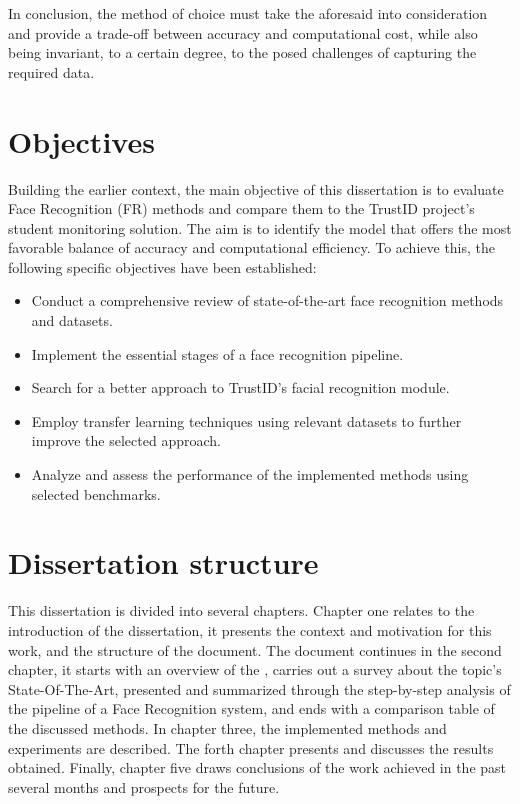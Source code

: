 \documentclass[class=report, crop=false, a4paper, 12pt]{standalone}
\begin{document}
\par In conclusion, the method of choice must take the aforesaid into consideration and provide a trade-off between accuracy and computational cost, while also being invariant, to a certain degree, to the posed challenges of capturing the required data. 

\section{Objectives}
Building  the earlier context, the main objective of this dissertation is to evaluate Face Recognition (FR) methods and compare them to the TrustID project's student monitoring solution. The aim is to identify the model that offers the most favorable balance of accuracy and computational efficiency. To achieve this, the following specific objectives have been established:
\begin{itemize}
    \item Conduct a comprehensive review of state-of-the-art face recognition methods and datasets.
    \item Implement the essential stages of a face recognition pipeline.
    \item Search for a better approach to TrustID's facial recognition module.
    \item Employ transfer learning techniques using relevant datasets to further improve the selected approach.
    \item Analyze and assess the performance of the implemented methods using selected benchmarks.
\end{itemize}

\section{Dissertation structure}
\par This dissertation is divided into several chapters. Chapter one relates to the introduction of the dissertation, it presents the context and motivation for this work, and the structure of the document. The document continues in the second chapter, it starts with an overview of the , carries out a survey about the topic's State-Of-The-Art, presented and summarized through the step-by-step analysis of the pipeline of a Face Recognition system, and ends with a comparison table of the discussed methods. In chapter three, the implemented methods and experiments are described. The forth chapter presents and discusses the results obtained. Finally, chapter five draws conclusions of the work achieved in the past several months and prospects for the future.
\end{document}
